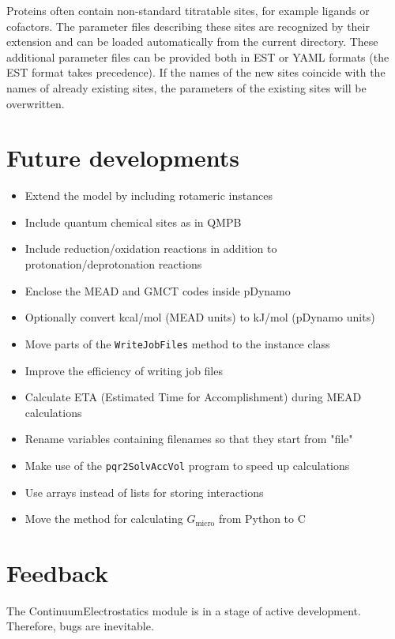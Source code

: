 \documentclass[a4paper,11pt]{article}
\newcommand{\modulename}{ContinuumElectrostatics\xspace}
\begin{document}
Proteins often contain non-standard titratable sites, for example ligands or cofactors.
%
The parameter files describing these sites are recognized by their extension and can be
loaded automatically from the current directory.
%
These additional parameter files can be provided both in EST or YAML formats (the EST format
takes precedence).
%
If the names of the new sites coincide with the names of already existing sites, the
parameters of the existing sites will be overwritten.


\section{Future developments}
\linespread{0.8}

\begin{itemize}
  \setlength{\itemsep}{1.0pt}
  \item Extend the model by including rotameric instances
  \item Include quantum chemical sites as in QMPB
  \item Include reduction/oxidation reactions in addition to protonation/deprotonation reactions
  \item Enclose the MEAD and GMCT codes inside pDynamo
  \item Optionally convert kcal/mol (MEAD units) to kJ/mol (pDynamo units)
  \item Move parts of the \texttt{WriteJobFiles} method to the instance class
  \item Improve the efficiency of writing job files
  \item Calculate ETA (Estimated Time for Accomplishment) during MEAD calculations
  \item Rename variables containing filenames so that they start from "file"
  \item Make use of the \texttt{pqr2SolvAccVol} program to speed up calculations 
  \item Use arrays instead of lists for storing interactions
  \item Move the method for calculating $G_{\mathrm{micro}}$ from Python to C
\end{itemize}

\linespread{1.6}


\section{Feedback}
The \modulename module is in a stage of active development.
%
Therefore, bugs are inevitable.
\end{document}
